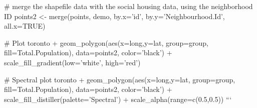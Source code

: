 # merge the shapefile data with the social housing data, using the neighborhood ID
points2 <- merge(points, demo, by.x='id', by.y='Neighbourhood.Id', all.x=TRUE)

# Plot
toronto + geom_polygon(aes(x=long,y=lat, group=group, fill=Total.Population), data=points2, color='black') + 
  scale_fill_gradient(low='white', high='red')

# Spectral plot
toronto + geom_polygon(aes(x=long,y=lat, group=group, fill=Total.Population), data=points2, color='black') + 
  scale_fill_distiller(palette='Spectral') + scale_alpha(range=c(0.5,0.5))
```
